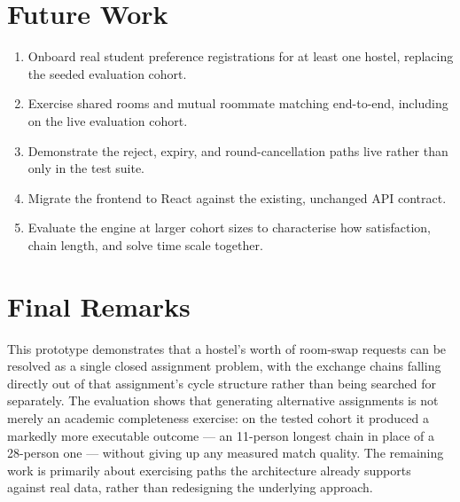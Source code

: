 \documentclass[11pt,a4paper]{report}
\begin{document}
\section{Future Work}

\begin{enumerate}

    \item Onboard real student preference registrations for at least
    one hostel, replacing the seeded evaluation cohort.

    \item Exercise shared rooms and mutual roommate matching
    end-to-end, including on the live evaluation cohort.

    \item Demonstrate the reject, expiry, and round-cancellation
    paths live rather than only in the test suite.

    \item Migrate the frontend to React against the existing,
    unchanged API contract.

    \item Evaluate the engine at larger cohort sizes to characterise
    how satisfaction, chain length, and solve time scale together.

\end{enumerate}

\section{Final Remarks}

This prototype demonstrates that a hostel's worth of room-swap
requests can be resolved as a single closed assignment problem, with
the exchange chains falling directly out of that assignment's cycle
structure rather than being searched for separately. The evaluation
shows that generating alternative assignments is not merely an
academic completeness exercise: on the tested cohort it produced a
markedly more executable outcome --- an 11-person longest chain in
place of a 28-person one --- without giving up any measured match
quality. The remaining work is primarily about exercising paths the
architecture already supports against real data, rather than
redesigning the underlying approach.


\printbibliography[heading=bibintoc]
\end{document}
